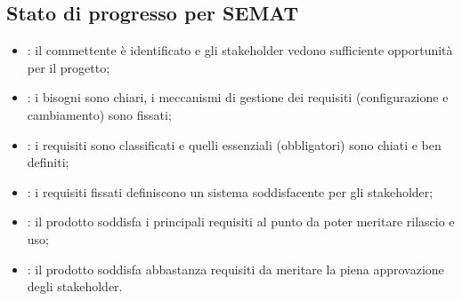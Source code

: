 \subsection{Stato di progresso per SEMAT}
\label{sub:stato_di_progresso_per_semat}

\begin{itemize}
  \item {}: il commettente è identificato e gli
    stakeholder vedono sufficiente opportunità per il progetto;
  \item {}: i bisogni sono chiari, i meccanismi di
    gestione dei requisiti (configurazione e cambiamento) sono
    fissati;
  \item {}: i requisiti sono classificati e quelli
    essenziali (obbligatori) sono chiati e ben definiti;
  \item {}: i requisiti fissati definiscono un
    sistema soddisfacente per gli stakeholder;
  \item {}: il prodotto soddisfa i principali
    requisiti al punto da poter meritare rilascio e uso;
  \item {}: il prodotto soddisfa abbastanza requisiti
    da meritare la piena approvazione degli stakeholder.
\end{itemize}
